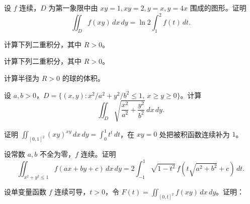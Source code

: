 \noindent\begin{minipage}{\textwidth}
设 $f$ 连续，$D$ 为第一象限中由 $xy=1,xy=2,y=x,y=4x$ 围成的图形。证明\[\iint_Df(xy)\,dx\,dy=\ln2\int_1^2f(t)\,dt.\]
\end{minipage}\par\vfill
\newpage
\noindent\begin{minipage}{\textwidth}
计算下列二重积分，其中 $R>0$。
\end{minipage}\par\vfill
\noindent\begin{minipage}{\textwidth}
计算下列二重积分，其中 $R>0$。
\end{minipage}\par\vfill
\noindent\begin{minipage}{\textwidth}
计算半径为 $R>0$ 的球的体积。
\end{minipage}\par\vfill
\newpage
\noindent\begin{minipage}{\textwidth}
设 $a,b>0$，$D=\{(x,y):x^2/a^2+y^2/b^2\le1,\ x\ge y\ge0\}$。计算\[\iint_D\sqrt{\frac{x^2}{a^2}+\frac{y^2}{b^2}}\,dx\,dy.\]
\end{minipage}\par\vfill
\noindent\begin{minipage}{\textwidth}
证明 $\displaystyle\iint_{[0,1]^2}(xy)^{xy}\,dx\,dy=\int_0^1t^t\,dt$，在 $xy=0$ 处把被积函数连续补为 $1$。
\end{minipage}\par\vfill
\noindent\begin{minipage}{\textwidth}
设常数 $a,b$ 不全为零，$f$ 连续。证明\[\iint_{x^2+y^2\le1}f(ax+by+c)\,dx\,dy=2\int_{-1}^1\sqrt{1-t^2}\,f\!\left(t\sqrt{a^2+b^2}+c\right)\,dt.\]
\end{minipage}\par\vfill
\newpage
\noindent\begin{minipage}{\textwidth}
设单变量函数 $f$ 连续可导，$t>0$，令 $F(t)=\iint_{[0,t]^2}f(xy)\,dx\,dy$。证明：
\end{minipage}\par\vfill
